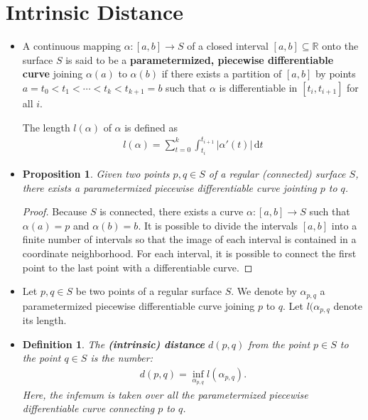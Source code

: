 \documentclass[10pt]{article}
\newtheorem{definition}[lemma]{Definition}
\newtheorem{proposition}[lemma]{Proposition}
\newcommand{\dee}{\mathrm{d}}
\newcommand{\ra}{\rightarrow}
\newcommand{\Real}{\mathbb{R}}
\newcommand{\sseq}{\subseteq}
\begin{document}
  \section{Intrinsic Distance}
  \begin{itemize}
    \item A continuous mapping $\alpha: [a,b] \ra S$ of a closed interval $[a,b] \sseq \Real$ onto the surface $S$ is said to be a {\bf parametermized, piecewise differentiable curve} joining $\alpha(a)$ to $\alpha(b)$ if there exists a partition of $[a,b]$ by points $a = t_0 < t_1 < \dotsb < t_k < t_{k+1} = b$ such that $\alpha$ is differentiable in $[t_i, t_{i+1}]$ for all $i$.

    The length $l(\alpha)$ of $\alpha$ is defined as
    \begin{align*}
      l(\alpha) = \sum_{t=0}^k \int_{t_{i}}^{t_{i+1}} |\alpha'(t)|\, \dee t
    \end{align*}

    \item \begin{proposition}
      Given two points $p, q \in S$ of a regular (connected) surface $S$, there exists a parametermized piecewise differentiable curve jointing $p$ to $q$.
    \end{proposition}
    \begin{proof}
      Because $S$ is connected, there exists a curve $\alpha: [a,b] \ra S$ such that $\alpha(a) = p$ and $\alpha(b) = b$. It is possible to divide the intervals $[a,b]$ into a finite number of intervals so that the image of each interval is contained in a coordinate neighborhood. For each interval, it is possible to connect the first point to the last point with a differentiable curve.
    \end{proof}

    \item Let $p, q \in S$  be two points of a regular surface $S$. We denote by $\alpha_{p,q}$ a parametermized piecewise differentiable curve joining $p$ to $q$. Let $l(\alpha_{p,q}$ denote its length.

    \item \begin{definition}
      The {\bf (intrinsic) distance} $d(p,q)$ from the point $p \in S$ to the point $q \in S$ is the number:
      \begin{align*}
        d(p,q) = \inf_{\alpha_{p,q}} l(\alpha_{p,q}).
      \end{align*}
      Here, the infemum is taken over all the parametermized piecewise differentiable curve connecting $p$ to $q$.
    \end{definition}


\end{itemize}
\end{document}
